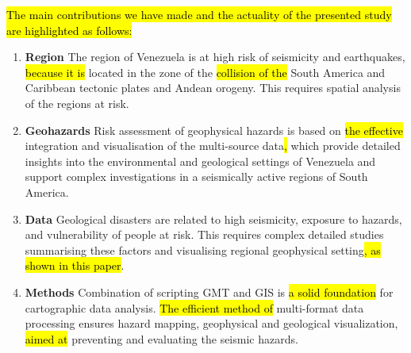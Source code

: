 \documentclass[sustainability,article,submit,pdftex,moreauthors]{Definitions/mdpi}
\begin{document}
\hl{The main contributions we have made and the actuality of the presented study are highlighted as follows:}

\begin{enumerate}
  \item \textbf{Region} The region of Venezuela is at high risk of seismicity and earthquakes, \hl{because it is }located in the zone of the\hl{ collision of the }South America and Caribbean tectonic plates and Andean orogeny. This requires spatial analysis of the regions at risk.
  \item \textbf{Geohazards} Risk assessment of geophysical hazards is based on\hl{ the effective }integration and visualisation of the multi-source data\hl{, }which provide detailed insights into the environmental and geological settings of Venezuela and support complex investigations in a seismically active regions of South America. 
    \item \textbf{Data} Geological disasters are related to high seismicity, exposure to hazards, and vulnerability of people at risk. This requires complex detailed studies summarising these factors and visualising regional geophysical setting\hl{, as shown in this paper}.
   \item \textbf{Methods} Combination of scripting GMT and GIS is \hl{a solid foundation} for cartographic data analysis. \hl{The efficient method of }multi-format data processing ensures hazard mapping, geophysical and geological visualization, \hl{aimed at} preventing and evaluating the seismic hazards.
\end{enumerate}

\vspace{6pt} 




\end{document}
